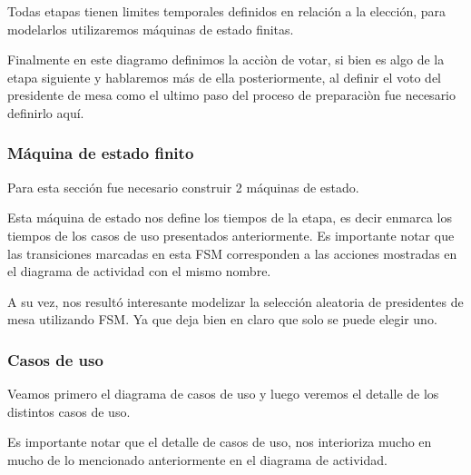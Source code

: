 Todas etapas tienen limites temporales definidos en relación a la elección, para modelarlos utilizaremos máquinas de estado finitas.

Finalmente en este diagramo definimos la acciòn de votar, si bien es algo de la etapa siguiente y hablaremos más de ella posteriormente, al definir el voto del presidente de mesa como el ultimo paso del proceso de preparaciòn fue necesario definirlo aquí.


\newpage
\subsubsection{Máquina de estado finito}

Para esta sección fue necesario construir 2 máquinas de estado.


Esta máquina de estado nos define los tiempos de la etapa, es decir enmarca los tiempos de los casos de uso presentados anteriormente. Es importante notar que las transiciones marcadas en esta FSM corresponden a las acciones mostradas en el diagrama de actividad con el mismo nombre.


A su vez, nos resultó interesante modelizar la selección aleatoria de presidentes de mesa utilizando FSM. Ya que deja bien en claro que solo se puede elegir uno.

\newpage
\subsubsection{Casos de uso}

Veamos primero el diagrama de casos de uso y luego veremos el detalle de los distintos casos de uso.


Es importante notar que el detalle de casos de uso, nos interioriza mucho en mucho de lo mencionado anteriormente en el diagrama de actividad. 


